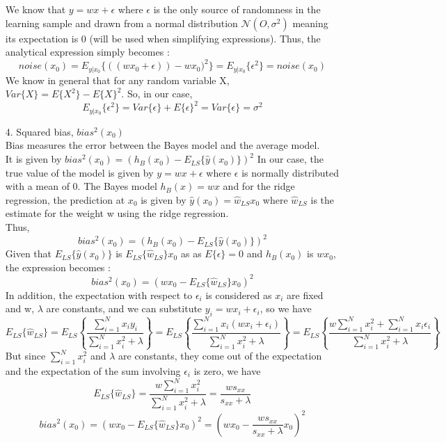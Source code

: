 \documentclass[12pt,titlepage]{article}
\begin{document}
\begin{enumerate}
     We know that $y = wx + \epsilon$ where $\epsilon$ is the only source of randomness in the learning sample and drawn from a normal distribution $\mathcal{N}(O, \sigma^{2})$ meaning its expectation is 0 (will be used when simplifying expressions). Thus, the analytical expression simply becomes :  
     $$noise(x_{0}) =  E_{y|x_{0}}\{((wx_{0} + \epsilon))-wx_{0})^{2}\} =  E_{y|x_{0}}\{\epsilon^{2}\} = noise(x_{0})$$
     We know in general that for any random variable X, $Var\{X\} = E\{X^{2}\} - E\{X\}^{2}$. So, in our case, $$E_{y|x_{0}}\{\epsilon^{2}\} = Var\{\epsilon\} + E\{\epsilon\}^{2} = Var\{\epsilon\} = \sigma^{2}$$
    \item[4.] Squared bias, $bias^{2}(x_{0})$ \\
    Bias measures the error between the Bayes model and the average model. \\
    It is given by $bias^{2}(x_{0}) = (h_{B}(x_{0}) - E_{LS}\{\hat{y}(x_{0})\})^{2}$
    In our case, the true value of the model is given by $y = wx + \epsilon$ where $\epsilon$ is normally distributed with a mean of 0. The Bayes model $h_{B}(x) = wx$ and for the ridge regression, the prediction at $x_{0}$ is given by $\hat{y}(x_{0}) = \hat{w}_{LS}x_{0}$ where $\hat{w}_{LS}$ is the estimate for the weight w using the ridge regression. \\ Thus,
    $$ bias^{2}(x_{0}) = (h_{B}(x_0) - E_{LS}\{\hat{y}(x_{0})\})^{2} $$
    Given that $E_{LS}\{\hat{y}(x_{0})\}$ is $E_{LS}\{\hat{w}_{LS}\}x_{0}$ as as $E\{\epsilon\} = 0$ and $h_{B}(x_{0})$ is $wx_{0}$, the expression becomes : $$ bias^{2}(x_{0}) = (wx_{0}-E_{LS}\{\hat{w}_{LS}\}x_{0})^{2}$$
    In addition, the expectation with respect to $\epsilon_{i}$ is considered as $x_{i}$ are fixed and w, $\lambda$ are constants, and we can substitute $y_{i} = wx_{i}+\epsilon_{i}$, so we have $$ E_{LS}\{\hat{w}_{LS}\} = E_{LS}\left\{\frac{\sum_{i=1}^{N}x_{i}y_{i}}{\sum_{i=1}^{N}x_{i}^{2} + \lambda}\right\} = E_{LS}\left\{\frac{\sum_{i=1}^{N}x_{i}(wx_{i}+\epsilon_{i})}{\sum_{i=1}^{N}x_{i}^{2} + \lambda}\right\} = E_{LS}\left\{\frac{w\sum_{i=1}^{N}x_{i}^{2} + \sum_{i=1}^{N} x_{i}\epsilon_{i}}{\sum_{i=1}^{N}x_{i}^{2} + \lambda}\right\} $$
    But since $\sum_{i=1}^{N} x_{i}^{2}$ and $\lambda$ are constants, they come out of the expectation and the expectation of the sum involving $\epsilon_{i}$ is zero, we have $$E_{LS}\{\hat{w}_{LS}\} = \frac{w\sum_{i=1}^{N}x_{i}^{2}}{\sum_{i=1}^{N}x_{i}^{2} + \lambda} = \frac{w s_{xx}}{s_{xx} + \lambda}$$
    $$ bias^{2}(x_{0}) = (wx_{0}-E_{LS}\{\hat{w}_{LS}\}x_{0})^{2} = (wx_{0}-\frac{w s_{xx}}{s_{xx} + \lambda} x_{0})^{2}$$

\end{enumerate}
\end{document}
